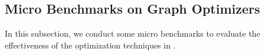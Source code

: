 \subsection{Micro Benchmarks on Graph Optimizers}
\label{sec:experiment-opt}
In this subsection, we conduct some micro benchmarks to evaluate the effectiveness of the optimization techniques in \name.




